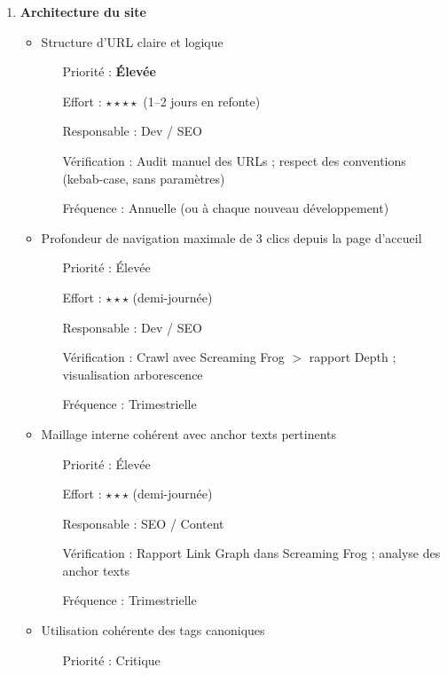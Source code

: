 \documentclass[12pt,a4paper,twoside]{report}
\begin{document}
\begin{enumerate}
    \item \textbf{Architecture du site}
    \begin{itemize}
        \item Structure d'URL claire et logique
        \begin{itemize}
            \item[Priorité :] \textbf{Élevée}
            \item[Effort :] $\star\star\star\star$ (1--2 jours en refonte)
            \item[Responsable :] Dev / SEO
            \item[Vérification :] Audit manuel des URLs ; respect des conventions (kebab-case, sans paramètres)
            \item[Fréquence :] Annuelle (ou à chaque nouveau développement)
        \end{itemize}
        \item Profondeur de navigation maximale de 3 clics depuis la page d'accueil
        \begin{itemize}
            \item[Priorité :] Élevée
            \item[Effort :] $\star\star\star$ (demi-journée)
            \item[Responsable :] Dev / SEO
            \item[Vérification :] Crawl avec Screaming Frog $>$ rapport Depth ; visualisation arborescence
            \item[Fréquence :] Trimestrielle
        \end{itemize}
        \item Maillage interne cohérent avec anchor texts pertinents
        \begin{itemize}
            \item[Priorité :] Élevée
            \item[Effort :] $\star\star\star$ (demi-journée)
            \item[Responsable :] SEO / Content
            \item[Vérification :] Rapport Link Graph dans Screaming Frog ; analyse des anchor texts
            \item[Fréquence :] Trimestrielle
        \end{itemize}
        \item Utilisation cohérente des tags canoniques
        \begin{itemize}
            \item[Priorité :] Critique

\end{itemize}
\end{itemize}
\end{enumerate}
\end{document}
